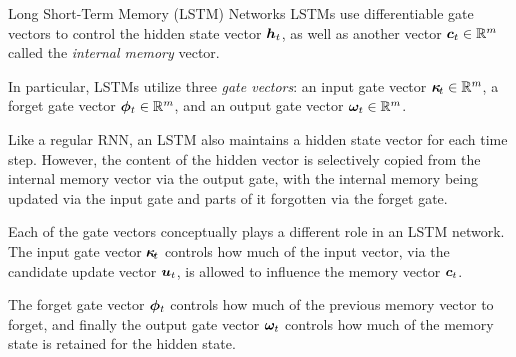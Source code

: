 %
%
%
\begin{frame}{Long Short-Term Memory (LSTM) Networks}
LSTMs %
use differentiable gate vectors to control the hidden
state vector ${\boldsymbol h}_t$, as well as another
vector ${\boldsymbol c}_t \in {\mathord{\mathbb R}}^m$ called the
{\em internal memory} vector. 
 
\medskip

In particular, LSTMs utilize three {\em gate vectors}:
an input gate vector ${\bm \kappa}_{\!t} \in {\mathord{\mathbb R}}^m$, 
a forget gate vector ${\bm \phi}_t \in {\mathord{\mathbb R}}^m$, 
and an output gate vector ${\bm \omega}_t \in {\mathord{\mathbb R}}^m$.
 
\medskip

Like a regular RNN, an LSTM also maintains a hidden state vector for each
time step. However, the content of the hidden vector is selectively
copied from the internal memory vector via the output gate, with the
internal memory being updated via the input gate and parts of
it forgotten via the forget gate.

\medskip

Each of the gate vectors conceptually plays a different role in an LSTM network. The
input gate vector ${\bm \kappa}_{\!t}$ controls how much of the input vector,
via the candidate update vector ${\boldsymbol u}_t$, is allowed to
influence the memory vector ${\boldsymbol c}_t$. 

\medskip

The forget gate vector ${\bm \phi}_t$
controls how much of the previous memory vector to forget, and finally
the output gate vector ${\bm \omega}_t$ controls how much of the memory state
is retained for the hidden state. 
\end{frame}
%
